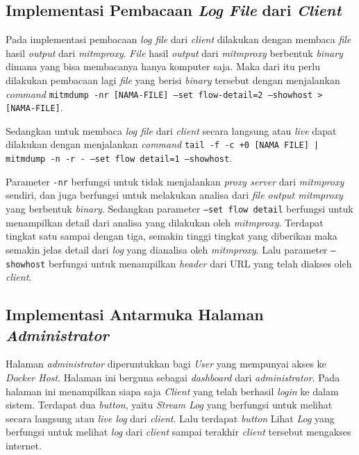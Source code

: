 \subsection{Implementasi Pembacaan \textit{Log File} dari \textit{Client}}
Pada implementasi pembacaan \textit{log file} dari \textit{client} dilakukan dengan membaca \textit{file} hasil \textit{output} dari \textit{mitmproxy}. \textit{File} hasil \textit{output} dari \textit{mitmproxy} berbentuk \textit{binary} dimana yang bisa membacanya hanya komputer saja. Maka dari itu perlu dilakukan pembacaan lagi \textit{file} yang berisi \textit{binary} tersebut dengan menjalankan \textit{command} \texttt{mitmdump -nr [NAMA-FILE] --set flow-detail=2 --showhost > [NAMA-FILE]}.

Sedangkan untuk membaca \textit{log file} dari \textit{client} secara langsung atau \textit{live} dapat dilakukan dengan menjalankan \textit{command} \texttt{tail -f -c +0 [NAMA FILE] | mitmdump -n -r - --set flow detail=1 --showhost}.

Parameter \texttt{-nr} berfungsi untuk tidak menjalankan \textit{proxy server} dari \textit{mitmproxy} sendiri, dan juga berfungsi untuk melakukan analisa dari \textit{file output mitmproxy} yang berbentuk \textit{binary}. Sedangkan parameter \texttt{--set flow detail} berfungsi untuk menampilkan detail dari analisa yang dilakukan oleh \textit{mitmproxy}. Terdapat tingkat satu sampai dengan tiga, semakin tinggi tingkat yang diberikan maka semakin jelas detail dari \textit{log} yang dianalisa oleh \textit{mitmproxy}. Lalu parameter \texttt{--showhost} berfungsi untuk menampilkan \textit{header} dari URL yang telah diakses oleh \textit{client}.

\subsection{Implementasi Antarmuka Halaman \textit{Administrator}}
Halaman \textit{administrator} diperuntukkan bagi \textit{User} yang mempunyai akses ke \textit{Docker Host}. Halaman ini berguna sebagai \textit{dashboard} dari \textit{administrator}. Pada halaman ini menampilkan siapa saja \textit{Client} yang telah berhasil \textit{login} ke dalam sistem. Terdapat dua \textit{button}, yaitu \textit{Stream Log} yang berfungsi untuk melihat secara langsung atau \textit{live log} dari \textit{client}. Lalu terdapat \textit{button} Lihat \textit{Log} yang berfungsi untuk melihat \textit{log} dari \textit{client} sampai terakhir \textit{client} tersebut mengakses internet.

